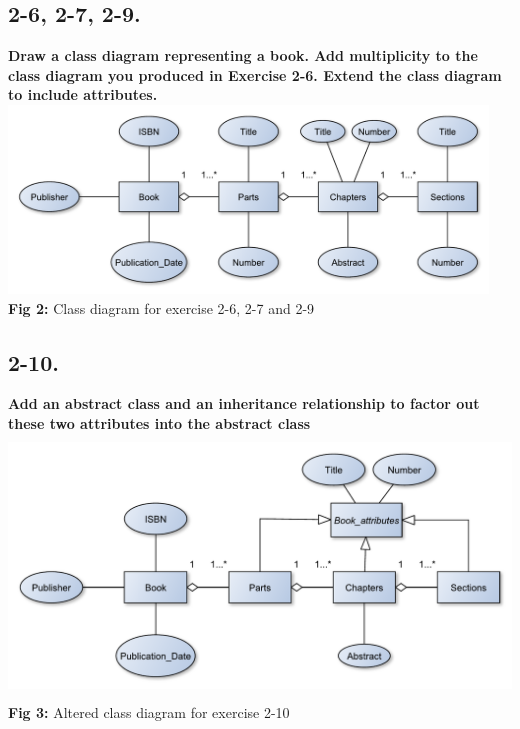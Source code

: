 \documentclass[12pt]{article}
\begin{document}
\subsection{2-6, 2-7, 2-9.}
\textbf{Draw a class diagram representing a book. Add multiplicity to the class diagram you produced in Exercise 2-6. Extend the class diagram to include attributes.}\\

\includegraphics[height=50mm]{2-6}\\
\textbf{Fig 2:} Class diagram for exercise 2-6, 2-7 and 2-9










\subsection{2-10.}
\textbf{Add an abstract class and an inheritance relationship to factor out these two attributes into the abstract class}\\

\includegraphics[height=70mm]{2-10}\\
\textbf{Fig 3:} Altered class diagram for exercise 2-10
\end{document}
